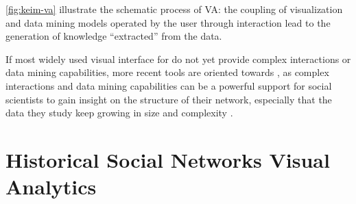 \autoref{fig:keim-va} illustrate the schematic process of VA: the coupling of visualization and data mining models operated by the user through interaction lead to the generation of knowledge ``extracted'' from the data.

If most widely used visual interface for \hsna do not yet provide complex interactions or data mining capabilities, more recent tools are oriented towards \va, as complex interactions and data mining capabilities can be a powerful support for social scientists to gain insight on the structure of their network, especially that the data they study keep growing in size and complexity \cite{kaplanVeniceTimeMachine2015}.




\section{Historical Social Networks Visual Analytics}\label{sec:intro-HSNV}

